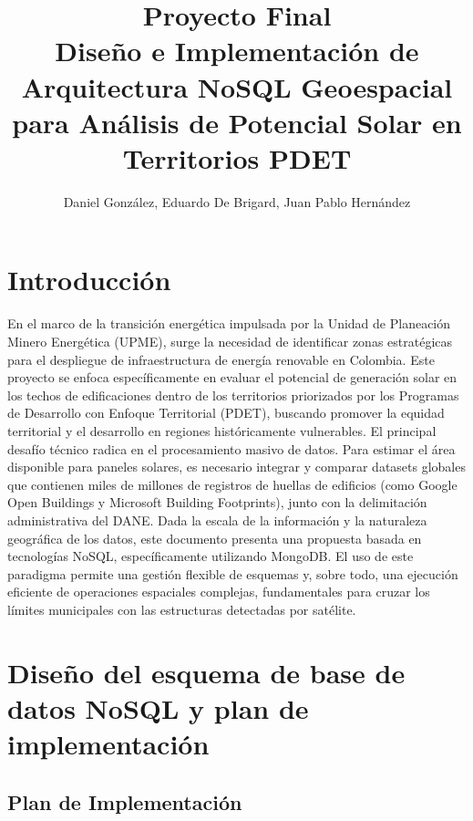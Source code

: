 \documentclass{article}
\title{Proyecto Final\\
Diseño e Implementación de Arquitectura NoSQL Geoespacial para Análisis de Potencial Solar en Territorios PDET}
\author{Daniel González, Eduardo De Brigard, Juan Pablo Hernández}
\begin{document}
\maketitle

\section{Introducción}

En el marco de la transición energética impulsada por la Unidad de Planeación Minero Energética (UPME), surge la necesidad de identificar zonas estratégicas para el despliegue de infraestructura de energía renovable en Colombia. Este proyecto se enfoca específicamente en evaluar el potencial de generación solar en los techos de edificaciones dentro de los territorios priorizados por los Programas de Desarrollo con Enfoque Territorial (PDET), buscando promover la equidad territorial y el desarrollo en regiones históricamente vulnerables.  El principal desafío técnico radica en el procesamiento masivo de datos. Para estimar el área disponible para paneles solares, es necesario integrar y comparar datasets globales que contienen miles de millones de registros de huellas de edificios (como Google Open Buildings y Microsoft Building Footprints), junto con la delimitación administrativa del DANE.  Dada la escala de la información y la naturaleza geográfica de los datos, este documento presenta una propuesta basada en tecnologías NoSQL, específicamente utilizando MongoDB. El uso de este paradigma permite una gestión flexible de esquemas y, sobre todo, una ejecución eficiente de operaciones espaciales complejas, fundamentales para cruzar los límites municipales con las estructuras detectadas por satélite.


\section{Diseño del esquema de base de datos NoSQL y plan de implementación}

 \subsection{Plan de Implementación}
\end{document}
